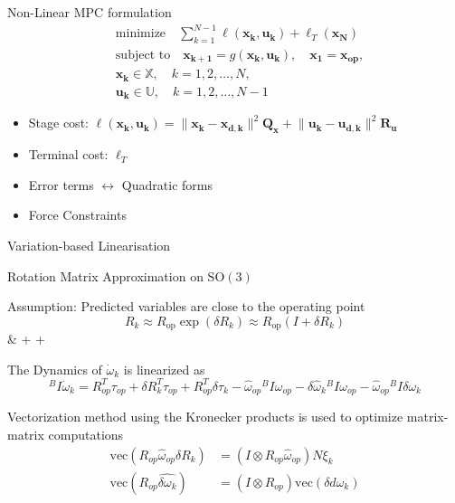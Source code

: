 \documentclass{beamer}
\begin{document}
\begin{frame}{Non-Linear MPC formulation}
\begin{equation*}
\begin{aligned}
    & \text{minimize} \quad \sum_{k=1}^{N-1} \ell(\mathbf{x_k}, \mathbf{u_k}) + \ell_T(\mathbf{x_N}) \\
    & \text{subject to} \quad \mathbf{x_{k+1}} = g(\mathbf{x_k}, \mathbf{u_k}), \quad \mathbf{x_1} = \mathbf{x_\text{op}}, \\
    & \mathbf{x_k} \in \mathbb{X}, \quad k = 1, 2, \dots, N, \\
    & \mathbf{u_k} \in \mathbb{U}, \quad k = 1, 2, \dots, N-1
\end{aligned}
\end{equation*}
\begin{itemize}
    \item Stage cost: $ \ell(\mathbf{x_k}, \mathbf{u_k}) = \lVert \mathbf{x_k} - \mathbf{x_{d, k}} \rVert ^ 2 \mathbf{Q_x} + \lVert \mathbf{u_k} - \mathbf{u_{d, k}} \rVert ^ 2 \mathbf{R_u}$
    \item Terminal cost: $ \ell_T $
    \item Error terms $\leftrightarrow$ Quadratic forms
    \item Force Constraints
\end{itemize}
\end{frame}

\begin{frame}{Variation-based Linearisation}
\begin{block}{Rotation Matrix Approximation on \(\text{SO}(3)\)}
\item Assumption: Predicted variables are close to the
operating point
\[
R_k \approx R_\text{op} \exp(\delta R_k) \approx R_\text{op}(I + \delta R_k)
\]
\implies
{} & \approx {} +  + 


\item The Dynamics of \(\dot{\omega}_k\) is linearized as
\[
    ^B I \dot{\omega}_k = R_{op}^T \tau_{op} + \delta R_k^T \tau_{op} + R_{op}^T \delta \tau_k - \hat{\omega}_{op} {}^B I \omega_{op} - \delta \hat{\omega}_k {}^B I \omega_{op} - \hat{\omega}_{op} {}^B I \delta \omega_k
\]
\end{block}

\item Vectorization method using the Kronecker products is used to optimize matrix-matrix computations
\begin{align*}
\text{vec}(R_{op} \hat{\omega}_{op} \delta R_k) &= (I \otimes R_{op} \hat{\omega}_{op}) N \xi_k \\
\text{vec}(R_{op} \widehat{\delta \omega_k}) &= (I \otimes R_{op}) \text{vec}(\delta d \omega_k)
\end{align*}

\end{frame}
\end{document}
